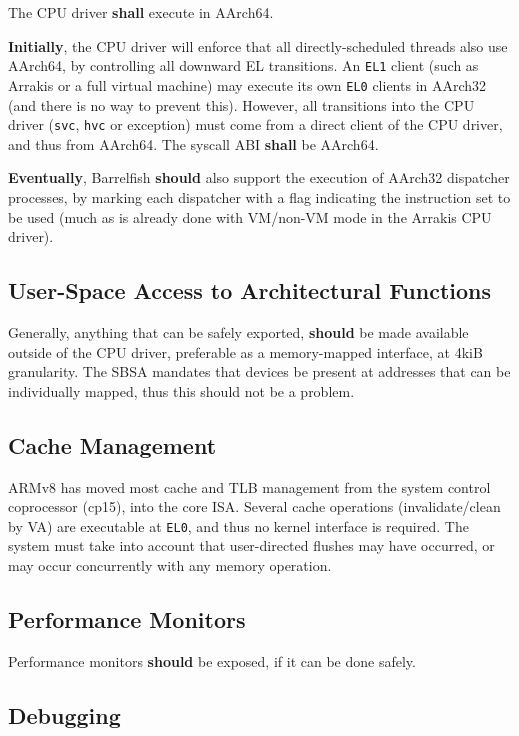 \documentclass[a4paper,twoside]{report}
\begin{document}
The CPU driver \textbf{shall} execute in AArch64.

\textbf{Initially}, the CPU driver will enforce that all directly-scheduled
threads also use AArch64, by controlling all downward EL transitions. An
\texttt{EL1} client (such as Arrakis or a full virtual machine) may execute
its own \texttt{EL0} clients in AArch32 (and there is no way to prevent this).
However, all transitions into the CPU driver (\texttt{svc}, \texttt{hvc} or
exception) must come from a direct client of the CPU driver, and thus from
AArch64. The syscall ABI \textbf{shall} be AArch64.

\textbf{Eventually}, Barrelfish \textbf{should} also support the execution of
AArch32 dispatcher processes, by marking each dispatcher with a flag
indicating the instruction set to be used (much as is already done with
VM/non-VM mode in the Arrakis CPU driver).

\subsection{User-Space Access to Architectural Functions}

Generally, anything that can be safely exported, \textbf{should} be made
available outside of the CPU driver, preferable as a memory-mapped interface,
at 4kiB granularity. The SBSA mandates that devices be present at addresses
that can be individually mapped, thus this should not be a problem.

\subsection{Cache Management}

ARMv8 has moved most cache and TLB management from the system control
coprocessor (cp15), into the core ISA. Several cache operations
(invalidate/clean by VA) are executable at \texttt{EL0}, and thus no kernel
interface is required. The system must take into account that user-directed
flushes may have occurred, or may occur concurrently with any memory
operation.

\subsection{Performance Monitors}

Performance monitors \textbf{should} be exposed, if it can be done safely.

\subsection{Debugging}
\end{document}
